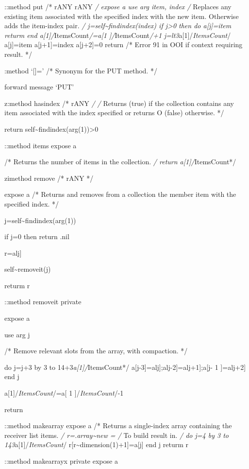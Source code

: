 ::method put /* rANY rANY \emph{/ expose a use arg item, index /}
Replaces any existing item associated with the specified index with the
new item. Otherwise adds the item-index pair. \emph{/
j=self\textasciitilde findindex(index) if j\textgreater0 then do
a{[}j{]}=item returm end a{[}1{]}/}ItemsCount\emph{/=a{[}1
{]}/}ItemsCount\emph{/+1 j=lt3}a{[}1{]}/\emph{ItemsCount}/ a{[}j{]}=item
a{[}j+1{]}=index a{[}j+2{]}=0 return /* Error 91 in OOI if context
requiring result. */

:method `{[}{]}=' /* Synonym for the PUT method. */

forward message `PUT'

z:method hasindex /* rANY \emph{/ /} Returns \textbar{} (true) if the
collection contains any item associated with the index specified or
returns O (false) otherwise. */

return self\textasciitilde findindex(arg(1))\textgreater0

::method items expose a

/* Returns the number of items in the collection. \emph{/ return
a{[}1{]}/}ItemsCount*/

zimethod remove /* rANY */

expose a /* Returns and removes from a collection the member item with
the specified index. */

j=self\textasciitilde findindex(arg(1))

if j=0 then return .nil

r=alj{]}

self\textasciitilde removeit(j)

returm r

::method removeit private

expose a

use arg j

/* Remove relevant slots from the array, with compaction. */

do j=j+3 by 3 to 14+3\emph{a{[}1{]}/}ItemsCount*/
a{[}j-3{]}=alj{]};alj-2{]}=alj+1{]};a{[}j- 1 {]}=alj+2{]} end j

a{[}1{]}/\emph{ItemsCount}/=a{[} 1 {]}/\emph{ItemsCount}/-1

return

::method makearray expose a /* Returns a single-index array containing
the receiver list items. \emph{/ r=.array\textasciitilde new = /} To
build result in. \emph{/ do j=4 by 3 to 143}a{[}1{]}/\emph{ItemsCount}/
r{[}r\textasciitilde dimension(1)+1{]}=a{[}j{]} end j returm r

::method makearrayx private expose a

